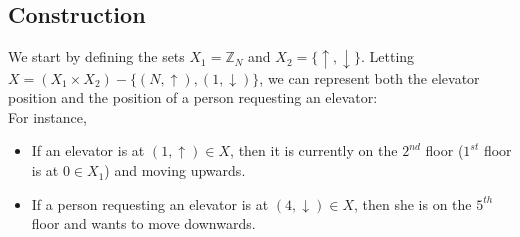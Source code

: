 \documentclass[letterpaper]{article} %
\begin{document}
\subsection{Construction}
We start by defining the sets $X_1 = \mathbb{Z}_N$ and $X_2 = \{\uparrow, \downarrow\}$. Letting $X = (X_1 \times X_2) - \{(N, \uparrow), (1, \downarrow)\}$, we can represent both the elevator position and the position of a person requesting an elevator:\\

For instance, 
\begin{itemize}
	\item If an elevator is at $(1, \uparrow) \in X$, then it is currently on the $2^{nd}$ floor ($1^{st}$ floor is at $0 \in X_1$) and moving upwards.
	\item If a person requesting an elevator is at $(4, \downarrow) \in X$, then she is on the $5^{th}$ floor and wants to move downwards. 
\end{itemize}
\end{document}
